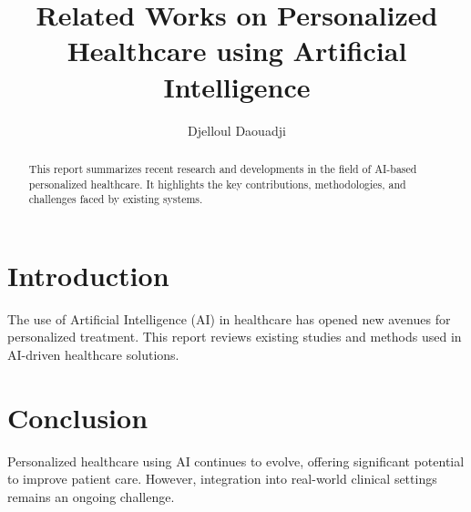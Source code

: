 \documentclass[12pt]{article}
\title{Related Works on Personalized Healthcare using Artificial Intelligence}
\author{Djelloul Daouadji}
\begin{document}
\maketitle

\begin{abstract}
This report summarizes recent research and developments in the field of AI-based personalized healthcare. It highlights the key contributions, methodologies, and challenges faced by existing systems.
\end{abstract}

\section{Introduction}
The use of Artificial Intelligence (AI) in healthcare has opened new avenues for personalized treatment. This report reviews existing studies and methods used in AI-driven healthcare solutions.


\section{Conclusion}
Personalized healthcare using AI continues to evolve, offering significant potential to improve patient care. However, integration into real-world clinical settings remains an ongoing challenge.



\end{document}

